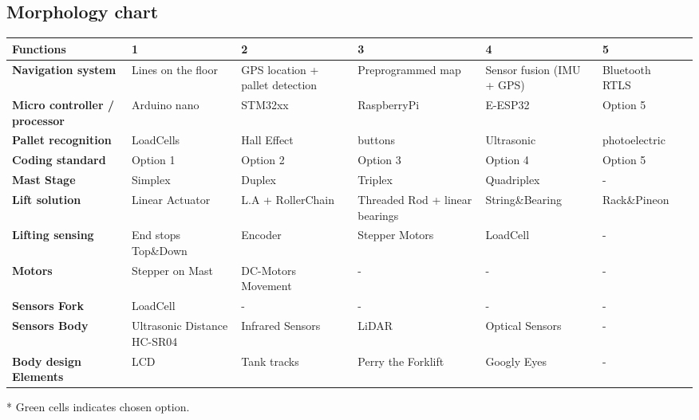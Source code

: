 \documentclass[../report.tex]{subfiles}
\begin{document}
\subsection{Morphology chart}
\begin{table}[H]
    \begin{center}
        \begin{tabularx}{\linewidth}{L|L|L|L|L|L|L}
            \textbf{Functions} & \textbf{1} & \textbf{2}& \textbf{3} & 
            \textbf{4} & \textbf{5} \\
            \hline
            \textbf{Navigation system} & Lines on the floor & GPS location + pallet detection & Preprogrammed map  & Sensor fusion (IMU + GPS) & 
            Bluetooth RTLS \\
            \hline
            \textbf{Micro controller / processor} & Arduino nano & STM32xx & RaspberryPi& E-ESP32 & 
            Option 5 \\
            \hline
            \textbf{Pallet recognition} & LoadCells & Hall Effect & buttons & Ultrasonic & 
            photoelectric \\
            \hline
            \textbf{Coding standard} & Option 1 & Option 2 & Option 3 & Option 4 & 
            Option 5 \\
            \hline
            \textbf{Mast Stage} & Simplex & Duplex & Triplex & Quadriplex & 
            -\\
            \hline
            \textbf{Lift solution} & Linear Actuator & L.A + RollerChain & Threaded Rod + linear bearings& String\&Bearing & Rack\&Pineon \\
            \hline
            \textbf{Lifting sensing} & End stops Top\&Down & Encoder & Stepper Motors & LoadCell & 
            -\\
            \hline
            \textbf{Motors} & Stepper on Mast & DC-Motors Movement & - & - & 
            -\\
            \hline
            \textbf{Sensors Fork} & LoadCell & - & - & - & 
            -\\
            \hline
            \textbf{Sensors Body} & Ultrasonic Distance HC-SR04 & Infrared Sensors & LiDAR & Optical Sensors & 
            -\\
            \hline
            \textbf{Body design Elements} & LCD & Tank tracks &Perry the Forklift & Googly Eyes & 
            - \\
            \hline
        \end{tabularx}
    \end{center}
\end{table}
* Green cells indicates chosen option.
\end{document}
